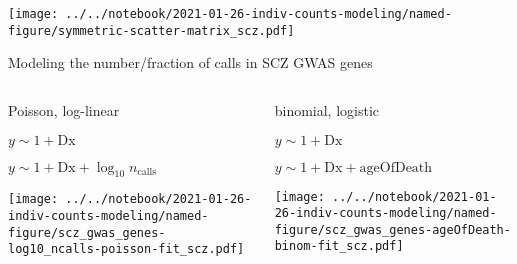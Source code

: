 \documentclass[usenames,dvipsnames]{beamer}
\begin{document}
\begin{frame}
\texttt{[image: ../../notebook/2021-01-26-indiv-counts-modeling/named-figure/symmetric-scatter-matrix\_scz.pdf]}
\end{frame}

\begin{frame}{Modeling the number/fraction of calls in SCZ GWAS genes}
\begin{columns}[t]
\begin{column}{0.5\textwidth}
\begin{center}
Poisson, log-linear
\begin{description}
\tiny
\item[M0] \(y \sim 1 + \mathrm{Dx}\)
\item[M1] \(y \sim 1 + \mathrm{Dx} + \log_{10} n_\mathrm{calls}\)
\end{description}
\end{center}
\texttt{[image: ../../notebook/2021-01-26-indiv-counts-modeling/named-figure/scz\_gwas\_genes-log10\_ncalls-poisson-fit\_scz.pdf]}
\end{column}

\begin{column}{0.5\textwidth}
\begin{center}
binomial, logistic
\begin{description}
\tiny
\item[M0] \(y \sim 1 + \mathrm{Dx}\)
\item[M1] \(y \sim 1 + \mathrm{Dx} + \mathrm{ageOfDeath}\)
\end{description}
\end{center}
\texttt{[image: ../../notebook/2021-01-26-indiv-counts-modeling/named-figure/scz\_gwas\_genes-ageOfDeath-binom-fit\_scz.pdf]}
\end{column}
\end{columns}
\begin{center}
\end{center}
\end{frame}
\end{document}
